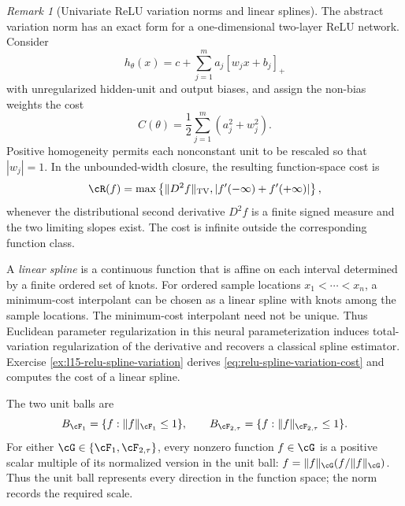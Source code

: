 \documentclass[11pt,twoside]{article}
\newcommand{\TV}{\operatorname{TV}}
\theoremstyle{definition}
\theoremstyle{remark}
\newtheorem{remark}[theorem]{Remark}
\begin{document}
\begin{remark}[Univariate ReLU variation norms and linear splines]
\label{rem:relu-spline-variation}
The abstract variation norm has an exact form for a one-dimensional
two-layer ReLU network. Consider
\[
 h_\theta(x)=c+\sum_{j=1}^m a_j[w_jx+b_j]_+
\]
with unregularized hidden-unit and output biases, and assign the non-bias
weights the cost
\[
 C(\theta)=\frac12\sum_{j=1}^m(a_j^2+w_j^2).
\]
Positive homogeneity permits each nonconstant unit to be rescaled so that
\(|w_j|=1\). In the unbounded-width closure, the resulting function-space
cost is
\begin{equation}
 \cR(f)
 =\max\left\{
   \|D^2f\|_{\TV},
   \left|f'(-\infty)+f'(+\infty)\right|
  \right\},
 \label{eq:relu-spline-variation-cost}
\end{equation}
whenever the distributional second derivative \(D^2f\) is a finite signed
measure and the two limiting slopes exist. The cost is infinite outside the
corresponding function class.

A \emph{linear spline} is a continuous function that is affine on each
interval determined by a finite ordered set of knots. For ordered sample
locations \(x_1<\cdots<x_n\), a minimum-cost interpolant can be chosen as a
linear spline with knots among the sample locations. The minimum-cost
interpolant need not be unique. Thus Euclidean parameter regularization in
this neural parameterization induces total-variation regularization of the
derivative and recovers a classical spline estimator. Exercise
\ref{ex:l15-relu-spline-variation} derives \cref{eq:relu-spline-variation-cost}
and computes the cost of a linear spline.
\end{remark}

The two unit balls are
\begin{equation}
 B_{\cF_1}=\{f:\|f\|_{\cF_1}\leq1\},
 \qquad
 B_{\cF_{2,\tau}}=\{f:\|f\|_{\cF_{2,\tau}}\leq1\}.
 \label{eq:F1-F2-unit-balls}
\end{equation}
For either \(\cG\in\{\cF_1,\cF_{2,\tau}\}\), every nonzero function
\(f\in\cG\) is a positive scalar multiple of its normalized version in the
unit ball:
\(f=\|f\|_{\cG}(f/\|f\|_{\cG})\). Thus the unit ball represents every
direction in the function space; the norm records the required scale.
\end{document}
